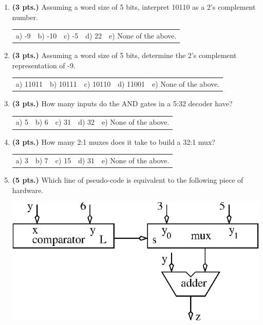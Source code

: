 \documentclass{article}
\begin{document}
\begin{enumerate}
\item {\bf (3 pts.)} Assuming a word size of 5 bits, interpret 10110 
as a 2's complement number.

\begin{tabular}{p{0.6in} p{0.6in} p{0.6in} p{0.6in} l}
a) -9 & b) -10 & c) -5 & d) 22 & e) None of the above.
\end{tabular}

\item {\bf (3 pts.)} Assuming a word size of 5 bits, determine the 2's complement
representation of -9.

\begin{tabular}{p{0.6in} p{0.6in} p{0.6in} p{0.6in} l}
a) 11011 & b) 10111 & c) 10110 & d) 11001 & e) None of the above.
\end{tabular}

\item {\bf (3 pts.)} How many inputs do the AND gates in a 5:32 decoder have?

\begin{tabular}{p{0.6in} p{0.6in} p{0.6in} p{0.6in} l}
a) 5 & b) 6 & c) 31 & d) 32 & e) None of the above.
\end{tabular}

\item {\bf (3 pts.)} How many 2:1 muxes does it take to build a 32:1 mux?

\begin{tabular}{p{0.6in} p{0.6in} p{0.6in} p{0.6in} l}
a) 3 & b) 7 & c) 15 & d) 31 & e) None of the above.
\end{tabular}

\item {\bf (5 pts.)} Which line of pseudo-code is equivalent to 
the following piece of hardware.  

\includegraphics{./Fig2/conditional2}


\end{enumerate}
\end{document}

